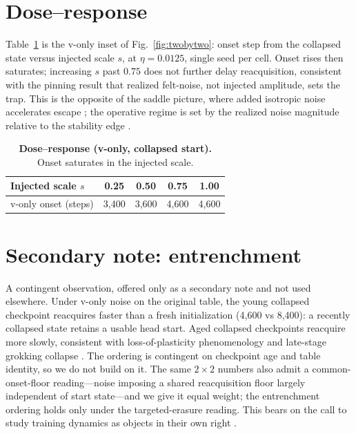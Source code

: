 \documentclass[10pt]{article}
\begin{document}
\section{Dose--response}
\label{app:dose}
Table~\ref{tab:dose} is the v-only inset of Fig.~\ref{fig:twobytwo}: onset step
from the collapsed state versus injected scale $s$, at $\eta=0.0125$, single seed
per cell. Onset rises then saturates; increasing $s$ past $0.75$ does not further
delay reacquisition, consistent with the pinning result that realized felt-noise,
not injected amplitude, sets the trap. This is the opposite of the saddle picture,
where added isotropic noise accelerates escape \citep{saddle,zhu}; the operative
regime is set by the realized noise magnitude relative to the stability edge
\citep{wumae,eoss}.

\begin{table}[h]
\centering
\footnotesize
\begin{tabular}{@{}l c c c c@{}}
\toprule
Injected scale $s$ & 0.25 & 0.50 & 0.75 & 1.00 \\
\midrule
v-only onset (steps) & 3{,}400 & 3{,}600 & 4{,}600 & 4{,}600 \\
\bottomrule
\end{tabular}
\caption{\textbf{Dose--response (v-only, collapsed start).} Onset saturates in
the injected scale.}
\label{tab:dose}
\end{table}

\section{Secondary note: entrenchment}
\label{app:entrench}
A contingent observation, offered only as a secondary note and not used elsewhere.
Under v-only noise on the original table, the young collapsed checkpoint reacquires
faster than a fresh initialization (4{,}600 vs 8{,}400): a recently collapsed state
retains a usable head start. Aged collapsed checkpoints reacquire more slowly,
consistent with loss-of-plasticity phenomenology \citep{dohare} and late-stage
grokking collapse \citep{antigrok}. The ordering is contingent on checkpoint age
and table identity, so we do not build on it. The same $2\times2$ numbers also
admit a common-onset-floor reading---noise imposing a shared reacquisition floor
largely independent of start state---and we give it equal weight; the entrenchment
ordering holds only under the targeted-erasure reading. This bears on the call to
study training dynamics as objects in their own right \citep{position}.
\end{document}
